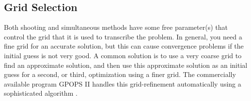 \subsection{Grid Selection}

Both shooting and simultaneous methods have some free parameter(s) that control the grid that it is used to transcribe the problem. In general, you need a fine grid for an accurate solution, but this can cause convergence problems if the initial guess is not very good. A common solution is to use a very coarse grid to find an approximate solution, and then use this approximate solution as an initial guess for a second, or third, optimization using a finer grid. The commercially available program GPOPS II handles this grid-refinement automatically using a sophisticated algorithm \cite{Darby2011a}.

